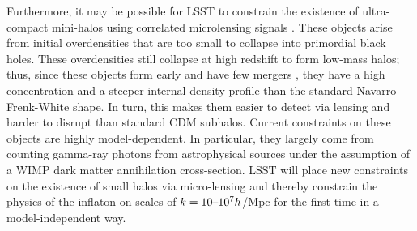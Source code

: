 Furthermore, it may be possible for LSST to constrain the existence of ultra-compact mini-halos using correlated microlensing signals \citep{erickcek2011,li2012}. These objects arise from initial overdensities that are too small to collapse into primordial black holes. These overdensities still collapse at high redshift to form low-mass halos; thus, since these objects form early and have few mergers \citep{Bringmann:2012,Delos:2018}, they have a high concentration and a steeper internal density profile than the standard Navarro-Frenk-White shape. In turn, this makes them easier to detect via lensing and harder to disrupt than standard CDM subhalos. Current constraints on these objects are highly model-dependent. In particular, they largely come from counting gamma-ray photons from astrophysical sources under the assumption of a WIMP dark matter annihilation cross-section. LSST will place new constraints on the existence of small halos via micro-lensing and thereby constrain the physics of the inflaton on scales of $k = 10 \textup{--} 10^7 h$/Mpc for the first time in a model-independent way.
